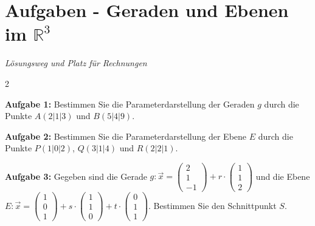 \documentclass[12pt,a4paper]{article}
\newcommand{\vek}[1]{\vec{#1}}
\begin{document}
\section*{Aufgaben - Geraden und Ebenen im $\mathbb{R}^3$}
\begin{center}
\textit{Lösungsweg und Platz für Rechnungen}
\end{center}
\vspace{1cm}

\begin{multicols}{2}

\textbf{Aufgabe 1:} Bestimmen Sie die Parameterdarstellung der Geraden $g$ durch die Punkte $A(2|1|3)$ und $B(5|4|9)$.

\vspace{3cm}

\textbf{Aufgabe 2:} Bestimmen Sie die Parameterdarstellung der Ebene $E$ durch die Punkte $P(1|0|2)$, $Q(3|1|4)$ und $R(2|2|1)$.

\vspace{3cm}

\textbf{Aufgabe 3:} Gegeben sind die Gerade $g: \vek{x} = \begin{pmatrix}2\\1\\-1\end{pmatrix} + r \cdot \begin{pmatrix}1\\1\\2\end{pmatrix}$ und die Ebene $E: \vek{x} = \begin{pmatrix}1\\0\\1\end{pmatrix} + s \cdot \begin{pmatrix}1\\1\\0\end{pmatrix} + t \cdot \begin{pmatrix}0\\1\\1\end{pmatrix}$. Bestimmen Sie den Schnittpunkt $S$.

\vspace{3cm}


\end{multicols}
\end{document}
